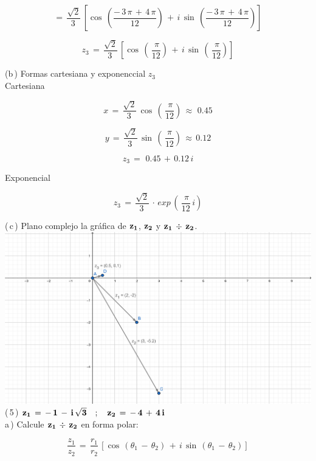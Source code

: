 \documentclass[a4paper,11pt,openany]{book}
\begin{document}
$$=\,\dfrac{\sqrt{2}}{3\,}\,\left[\cos\,\left(\dfrac{-\,3\,\pi\,+\,4\,\pi}{12}\right)\,+\,i\,\sin\,\left(\dfrac{-\,3\,\pi\,+\,4\,\pi}{12}\right)\right]$$

$$z_{3}\,=\,\dfrac{\sqrt{2}}{3\,}\,\left[\cos\,\left(\,\dfrac{\,\pi}{12}\right)\,+\,i\,\sin\,\left(\,\dfrac{\,\pi}{12}\right)\right]$$

\newpage

\textcolor{ao(english)}{(b\,)} Formas cartesiana y exponenccial $z_{3}$\\

\textcolor{ao(english)}{} Cartesiana

$$x\,=\,\dfrac{\sqrt{2}}{3\,}\,\cos\,\left(\,\dfrac{\,\pi}{12}\right)\,\approx\,\,0.45$$

$$y\,=\,\dfrac{\sqrt{2}}{3\,}\,\sin\,\left(\,\dfrac{\pi}{12}\right)\,\approx\,0.12$$

$$z_{3}\,=\,\,0.45\,+\,0.12\,i$$

\textcolor{ao(english)}{} Exponencial

$$z_{3}\,=\,\dfrac{\sqrt{2}}{3\,}\,\cdot\,exp\,\left(\,\dfrac{\,\pi}{12}\,i\right)$$

\textcolor{ao(english)}{(\,c\,)} Plano complejo la gráfica de $\bf{z_{1}}$, $\bf{z_{2}}$ y $\bf{z_{1}\,\div\,z_{2}}$.\\

\includegraphics[width=15cm]{Gra-Ej-4.}\\

\textcolor{ao(english)}{(\,5\,)} $\bf{z_{1}\,=\,-\,1\,-\,i\,\sqrt{3} \quad;\quad z_{2}\,=\,-\,4\,+\,4\,i}$\\

\textcolor{ao(english)}{a\,)} Calcule $\bf{z_{1}\,\div\,z_{2}}$ en forma polar:

$$\dfrac{z_{1}}{z_{2}}\,=\,\dfrac{r_{1}}{r_{2}}\,\left[\cos\,(\theta_{1}\,-\,\theta_{2})\,+\,i\,\sin\,(\theta_{1}\,-\,\theta_{2})\right]$$
\end{document}
